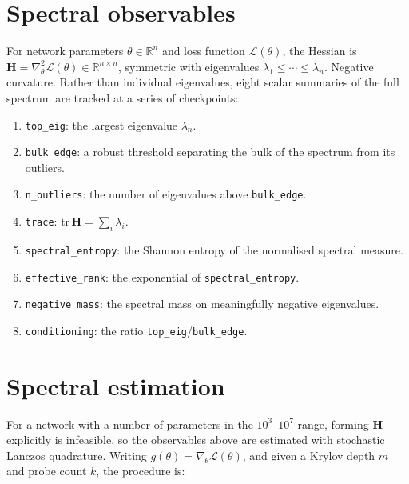 \documentclass[11pt,a4paper]{article}
\newcommand{\R}{\mathbb{R}}
\newcommand{\bH}{\mathbf{H}}
\begin{document}
\section{Spectral observables}
\label{sec:hess-observables}

For network parameters $\theta \in \R^n$ and loss function $\mathcal{L}(\theta)$, the Hessian is
$\bH = \nabla^2_\theta \mathcal{L}(\theta) \in \R^{n\times n}$, symmetric with
eigenvalues $\lambda_1 \le \cdots \le \lambda_n$. Negative curvature. Rather than individual eigenvalues, eight scalar summaries of the full spectrum are tracked at a series of checkpoints:

\begin{enumerate}[leftmargin=*,itemsep=1pt,label=(\roman*)]
    \item \texttt{top\_eig}: the largest eigenvalue $\lambda_n$.
    \item \texttt{bulk\_edge}: a robust threshold separating the bulk of the
    spectrum from its outliers.
    \item \texttt{n\_outliers}: the number of eigenvalues above
    \texttt{bulk\_edge}.
    \item \texttt{trace}: $\mathrm{tr}\,\bH = \sum_i \lambda_i$.
    \item \texttt{spectral\_entropy}: the Shannon entropy of the normalised
    spectral measure.
    \item \texttt{effective\_rank}: the exponential of \texttt{spectral\_entropy}.
    \item \texttt{negative\_mass}: the spectral mass on meaningfully negative
    eigenvalues.
    \item \texttt{conditioning}: the ratio \texttt{top\_eig}/\texttt{bulk\_edge}.
\end{enumerate}

\newpage 

\section{Spectral estimation}
\label{sec:hess-lanczos}

For a network with a number of parameters in the $10^3$--$10^7$ range, forming
$\bH$ explicitly is infeasible, so the observables above are estimated with
stochastic Lanczos quadrature. Writing
$g(\theta) = \nabla_\theta \mathcal{L}(\theta)$, and given a Krylov depth $m$
and probe count $k$, the procedure is:
\end{document}
